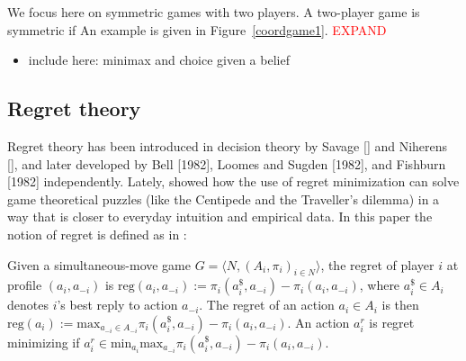 \documentclass[fleqn,reqno,11pt]{article}
\begin{document}
We focus here on symmetric games with two players. A two-player game is symmetric if An example
is given in Figure~\ref{coordgame1}. \textcolor{red}{EXPAND}

\begin{itemize}
\item include here: minimax and choice given a belief
\end{itemize}


\subsection{Regret theory} \label{sec:regreTheory}

Regret theory has been introduced in decision theory by Savage [] and Niherens [], and later
developed by Bell [1982], Loomes and Sugden [1982], and Fishburn [1982] independently. Lately,
\citet{HalpernPass2012:Iterated-Regret} showed how the use of regret minimization can solve
game theoretical puzzles (like the Centipede and the Traveller's dilemma) in a way that is
closer to everyday intuition and empirical data. In this paper the notion of regret is defined
as in \citet{HalpernPass2012:Iterated-Regret}:

\begin{definition} \label{defn:regret} Given a simultaneous-move
  game $ G=\langle N, (A_i , \pi_i)_{i \in N} \rangle $, the regret of player $i$ at profile
  $(a_i,a_{-i})$ is $\text{reg}(a_i,a_{-i}):= \pi_i(a_i^\$,a_{-i})-\pi_i(a_i,a_{-i}) $, where
  $a_i^\$ \in A_i$ denotes $i$'s best reply to action $a_{-i} $. The regret of an action
  $a_i \in A_i$ is then
  $\text{reg}(a_i):= \text{max}_{a_{-i}\in A_{-i}} \pi_i(a_i^\$,a_{-i})-\pi_i(a_i,a_{-i}) $. An
  action $a^{r}_i $ is regret minimizing if
  $a^{r}_i \in \text{min}_{a_i} \text{max}_{a_{-i}} \pi_i(a_i^\$,a_{-i})-\pi_i(a_i,a_{-i}) $.
\end{definition}
\end{document}
